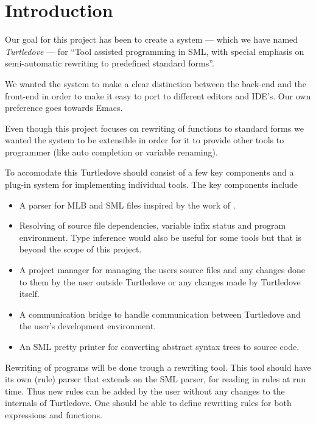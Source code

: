 \chapter{Introduction}\label{chap:introduction}
Our goal for this project has been to create a system --- which we have named
\textit{Turtledove} --- for ``Tool assisted programming in SML, with special
emphasis on semi-automatic rewriting to predefined standard forms''.

We wanted the system to make a clear distinction between the back-end and the
front-end in order to make it easy to port to different editors and IDE's. Our
own preference goes towards Emacs.

Even though this project focuses on rewriting of functions to standard forms we
wanted the system to be extensible in order for it to provide other tools to
programmer (like auto completion or variable renaming).

To accomodate this Turtledove should consist of a few key components and a
plug-in system for implementing individual tools. The key components include
\begin{itemize}
\item A parser for MLB and SML files inspired by the work of \cite{mbp08}.
\item Resolving of source file dependencies, variable infix status and program
  environment. Type inference would also be useful for some tools but that is
  beyond the scope of this project.
\item A project manager for managing the users source files and any changes done
  to them by the user outside Turtledove or any changes made by Turtledove
  itself.
\item A communication bridge to handle communication between Turtledove and the
  user's development environment.
\item An SML pretty printer for converting abstract syntax trees to source code.
\end{itemize}

Rewriting of programs will be done trough a rewriting tool. This tool should
have its own (rule) parser that extends on the SML parser, for reading in rules
at run time. Thus new rules can be added by the user without any changes to the
internals of Turtledove. One should be able to define rewriting rules for both
expressions and functions.

